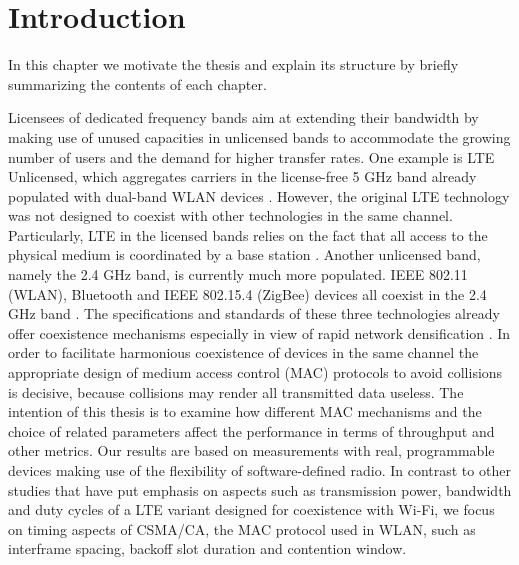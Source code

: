\chapter{Introduction}
\label{ch:introduction}

In this chapter we motivate the thesis and explain its structure by briefly summarizing the contents of each chapter.

Licensees of dedicated frequency bands aim at extending their bandwidth by making use of unused capacities in unlicensed bands to accommodate the growing number of users and the demand for higher transfer rates. One example is LTE Unlicensed, which aggregates carriers in the license-free 5 GHz band already populated with dual-band WLAN devices \cite{nihtilä13}\cite{qualcomm15}. However, the original LTE technology was not designed to coexist with other technologies in the same channel. Particularly, LTE in the licensed bands relies on the fact that all access to the physical medium is coordinated by a base station \cite{ghosh10}. Another unlicensed band, namely the 2.4 GHz band, is currently much more populated. IEEE 802.11 (WLAN), Bluetooth and IEEE 802.15.4 (ZigBee) devices all coexist in the 2.4 GHz band \cite{lee07}. The specifications and standards of these three technologies already offer coexistence mechanisms especially in view of rapid network densification \cite{bhushan14}. In order to facilitate harmonious coexistence of devices in the same channel the appropriate design of medium access control (MAC) protocols to avoid collisions is decisive, because collisions may render all transmitted data useless. The intention of this thesis is to examine how different MAC mechanisms and the choice of related parameters affect the performance in terms of throughput and other metrics. Our results are based on measurements with real, programmable devices making use of the flexibility of software-defined radio. In contrast to other studies \cite{gomezmiguelez16}\cite{capretti16} that have put emphasis on aspects such as transmission power, bandwidth and duty cycles of a LTE variant designed for coexistence with Wi-Fi, we focus on timing aspects of CSMA/CA, the MAC protocol used in WLAN, such as interframe spacing, backoff slot duration and contention window.

